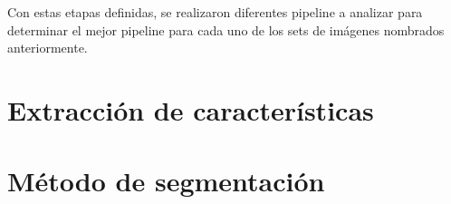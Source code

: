 Con estas etapas definidas, se realizaron diferentes pipeline a analizar para determinar el mejor pipeline para cada uno de los sets de im\'agenes nombrados anteriormente.


\section{Extracci\'on de caracter\'isticas}



\section{M\'etodo de segmentaci\'on}

